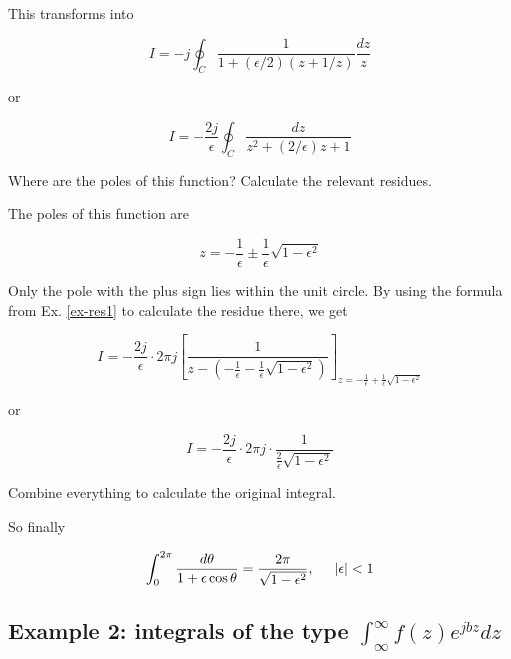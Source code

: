 This transforms into

\begin{equation}
I = -j \oint_{{C}} \frac{1}{1 + (\epsilon / 2)\left(z + 1/z\right)}
\frac{dz}{z}
\end{equation} 

or

\begin{equation}
I = -\frac{2j}{\epsilon} \oint_{{C}} \frac{dz}{z^2 + (2 / \epsilon)z +
1}
\end{equation} 

\begin{cue}
  Where are the poles of this function? Calculate the relevant residues.
\end{cue}

The poles of this function are

\begin{equation}
z = - \frac{1}{\epsilon} \pm \frac{1}{\epsilon} \sqrt{1 - \epsilon^2}
\end{equation} 

Only the pole with the plus sign lies within the unit circle. By using the formula from Ex. \ref{ex-res1} to calculate the residue there, we get

\begin{equation}
I = -\frac{2j}{\epsilon} \cdot 2 \pi j \left[\frac{1}{z - (-\frac{1}{\epsilon} -
\frac{1}{\epsilon} \sqrt{1 - \epsilon^2})}\right]_{z = - \frac{1}{\epsilon} +
\frac{1}{\epsilon} \sqrt{1 - \epsilon^2}}
\end{equation}

or

\begin{equation}
I = -\frac{2j}{\epsilon} \cdot 2 \pi j \cdot \frac{1}{\frac{2}{\epsilon} \sqrt{1
- \epsilon^2}}
\end{equation}

\begin{cue}
  Combine everything to calculate the original integral.
\end{cue}

So finally

\begin{equation}
\int_0^{2 \pi} \frac{d \theta}{1 + \epsilon \cos \theta} = \frac{2 \pi}{\sqrt{1
- \epsilon^2}}, \hspace{0.5cm} |\epsilon| < 1
\end{equation} 

\subsection*{Example 2: integrals of the type $\int_\infty^{\infty} f(z) e^{jbz} dz$}

